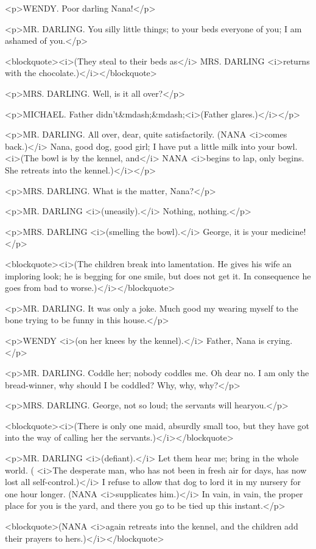 <p>WENDY. Poor darling Nana!</p>

<p>MR. DARLING. You silly little things; to your beds everyone of you; I am ashamed of you.</p>

<blockquote><i>(They steal to their beds as</i> MRS. DARLING <i>returns with the chocolate.)</i></blockquote>

<p>MRS. DARLING. Well, is it all over?</p>

<p>MICHAEL. Father didn't&mdash;&mdash;<i>(Father glares.)</i></p>

<p>MR. DARLING. All over, dear, quite satisfactorily. (NANA <i>comes back.)</i> Nana, good dog, good girl; I have put a little milk into your bowl. <i>(The bowl is by the kennel, and</i> NANA <i>begins to lap, only begins. She retreats into the kennel.)</i></p>

<p>MRS. DARLING. What is the matter, Nana?</p>

<p>MR. DARLING <i>(uneasily).</i> Nothing, nothing.</p>

<p>MRS. DARLING <i>(smelling the bowl).</i> George, it is your medicine!</p>

<blockquote><i>(The children break into lamentation. He gives his wife an imploring look; he is begging for one smile, but does not get it. In consequence he goes from bad to worse.)</i></blockquote>

<p>MR. DARLING. It was only a joke. Much good my wearing myself to the bone trying to be funny in this house.</p>

<p>WENDY <i>(on her knees by the kennel).</i> Father, Nana is crying.</p>

<p>MR. DARLING. Coddle her; nobody coddles me. Oh dear no. I am only the bread-winner, why should I be coddled? Why, why, why?</p>

<p>MRS. DARLING. George, not so loud; the servants will hearyou.</p>

<blockquote><i>(There is only one maid, absurdly small too, but they have got into the way of calling her the servants.)</i></blockquote>

<p>MR. DARLING <i>(defiant).</i> Let them hear me; bring in the whole world. ( <i>The desperate man, who has not been in fresh air for days, has now lost all self-control.)</i> I refuse to allow that dog to lord it in my nursery for one hour longer. (NANA <i>supplicates him.)</i> In vain, in vain, the proper place for you is the yard, and there you go to be tied up this instant.</p>

<blockquote>(NANA <i>again retreats into the kennel, and the children add their prayers to hers.)</i></blockquote>

